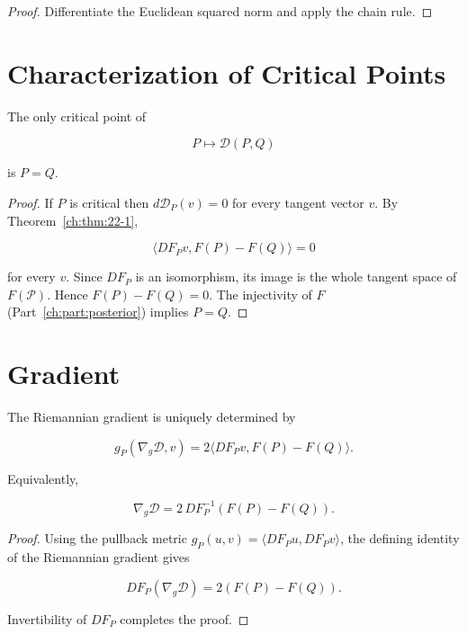 \begin{proof}
Differentiate the Euclidean squared norm and apply the chain rule.
\end{proof}

\section{Characterization of Critical Points}\label{ch:sec:characterisation-of-critical-points}

\begin{theorem}
\label{ch:thm:22-2}
The only critical point of

\[
P\mapsto\mathcal D(P,Q)
\]

is \(P=Q\).
\end{theorem}

\begin{proof}
If \(P\) is critical then \(d\mathcal D_P(v)=0\) for every tangent
vector \(v\). By Theorem~\ref{ch:thm:22-1},

\[
\langle DF_Pv,F(P)-F(Q)\rangle=0
\]

for every \(v\). Since \(DF_P\) is an isomorphism, its image is the
whole tangent space of \(F(\mathcal P)\). Hence \(F(P)-F(Q)=0\).
The injectivity of \(F\) (Part~\ref{ch:part:posterior}) implies \(P=Q\). 
\end{proof}

\section{Gradient}\label{ch:sec:gradient}

\begin{corollary}
\label{ch:cor:22-3}
The Riemannian gradient is uniquely determined by

\[
g_P(\nabla_g\mathcal D,v)=2\langle DF_Pv,F(P)-F(Q)\rangle.
\]

Equivalently,

\[
\nabla_g\mathcal D = 2\,DF_P^{-1}(F(P)-F(Q)).
\]
\end{corollary}

\begin{proof}
Using the pullback metric \(g_P(u,v)=\langle DF_Pu,DF_Pv\rangle\), the
defining identity of the Riemannian gradient gives

\[
DF_P(\nabla_g\mathcal D)=2(F(P)-F(Q)).
\]

Invertibility of \(DF_P\) completes the proof. 
\end{proof}

